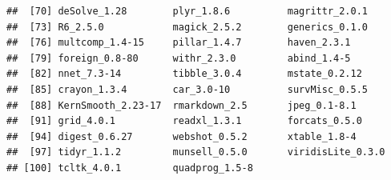 \documentclass[]{article}
\begin{document}
\begin{verbatim}
##  [70] deSolve_1.28        plyr_1.8.6          magrittr_2.0.1     
##  [73] R6_2.5.0            magick_2.5.2        generics_0.1.0     
##  [76] multcomp_1.4-15     pillar_1.4.7        haven_2.3.1        
##  [79] foreign_0.8-80      withr_2.3.0         abind_1.4-5        
##  [82] nnet_7.3-14         tibble_3.0.4        mstate_0.2.12      
##  [85] crayon_1.3.4        car_3.0-10          survMisc_0.5.5     
##  [88] KernSmooth_2.23-17  rmarkdown_2.5       jpeg_0.1-8.1       
##  [91] grid_4.0.1          readxl_1.3.1        forcats_0.5.0      
##  [94] digest_0.6.27       webshot_0.5.2       xtable_1.8-4       
##  [97] tidyr_1.1.2         munsell_0.5.0       viridisLite_0.3.0  
## [100] tcltk_4.0.1         quadprog_1.5-8
\end{verbatim}
\end{document}
